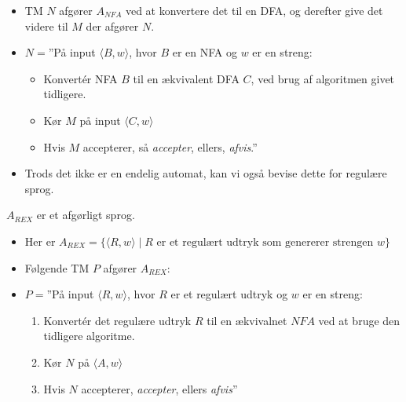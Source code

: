\begin{frame}[allowframebreaks]
	\begin{itemize}
		\item TM $N$ afgører $A_{NFA}$ ved at konvertere det til en DFA, og derefter give det videre til $M$ der afgører $N$.
		\item $N = $''På input \(\langle B, w  \rangle\), hvor $B$ er en NFA og $w$ er en streng:
		      \begin{itemize}
			      \item Konvertér NFA $B$ til en ækvivalent DFA $C$, ved brug af algoritmen givet tidligere.
			      \item Kør $M$ på input $\langle C, w \rangle $
			      \item Hvis $M$ accepterer, så \textit{accepter}, ellers, \textit{afvis}.''
		      \end{itemize}
	\end{itemize}

	\begin{itemize}
		\item Trods det ikke er en endelig automat, kan vi også bevise dette for regulære sprog.
	\end{itemize}

	\begin{theorem}
		$A_{REX}$ er et afgørligt sprog.
	\end{theorem}

	\begin{itemize}
		\item Her er $A_{REX} = \{\langle R, w \rangle \mid R \text{ er et regulært udtryk som genererer strengen }w\}$
		\item Følgende TM $P$ afgører $A_{REX}$:
		\item $P =$''På input \(\langle R, w \rangle\), hvor $R$ er et regulært udtryk og $w$ er en streng:
		      \begin{enumerate}
			      \item Konvertér det regulære udtryk $R$ til en ækvivalnet $NFA$ ved at bruge den tidligere algoritme.
			      \item Kør $N$ på $\langle A, w  \rangle $
			      \item Hvis $N$ accepterer, \textit{accepter}, ellers \textit{afvis}''
		      \end{enumerate}
	\end{itemize}
\end{frame}


